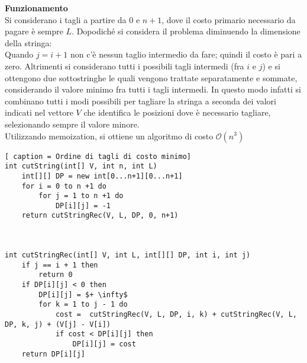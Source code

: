 \documentclass[../cheatSheetAlgoritmi.tex]{subfiles}
\begin{document}
\textbf{Funzionamento} \\
Si considerano i tagli a partire da $0$ e $n + 1$, dove il costo primario necessario da pagare è sempre $L$. Dopodiché si considera il problema diminuendo la dimensione della stringa: \\
Quando $j = i + 1$ non c'è nessun taglio intermedio da fare; quindi il costo è pari a zero. Altrimenti si considerano tutti i possibili tagli intermedi (fra $i$ e $j$) e si ottengono due sottostringhe le quali vengono trattate separatamente e sommate, considerando il valore minimo fra tutti i tagli intermedi. In questo modo infatti si combinano tutti i modi possibili per tagliare la stringa a seconda dei valori indicati nel vettore $V$ che identifica le posizioni dove è necessario tagliare, selezionando sempre il valore minore. \\
Utilizzando memoization, si ottiene un algoritmo di costo $\mathcal{O}(n^3)$
\begin{lstlisting}[ caption = Ordine di tagli di costo minimo]
int cutString(int[] V, int n, int L)
	int[][] DP = new int[0...n+1][0...n+1]
	for i = 0 to n +1 do
		for j = 1 to n +1 do
			DP[i][j] = -1
	return cutStringRec(V, L, DP, 0, n+1)



int cutStringRec(int[] V, int L, int[][] DP, int i, int j)
	if j == i + 1 then
		return 0
	if DP[i][j] < 0 then
		DP[i][j] = $+ \infty$
		for k = 1 to j - 1 do
			cost =  cutStringRec(V, L, DP, i, k) + cutStringRec(V, L, DP, k, j) + (V[j] - V[i])
			if cost < DP[i][j] then
				DP[i][j] = cost
	return DP[i][j]
\end{lstlisting}
\newpage
\end{document}
